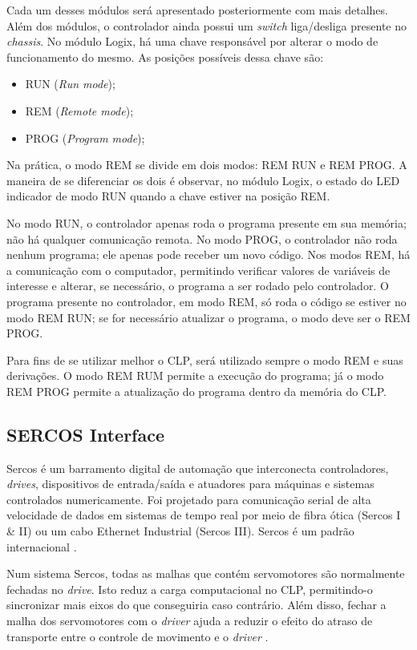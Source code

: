 Cada um desses módulos será apresentado posteriormente com mais detalhes. Além dos módulos, o controlador ainda possui um \textit{switch} liga/desliga presente no \textit{chassis}. No módulo Logix, há uma chave responsável por alterar o modo de funcionamento do mesmo. As posições possíveis dessa chave são:
\begin{itemize}
  \item RUN (\textit{Run mode});
  \item REM (\textit{Remote mode});
  \item PROG (\textit{Program mode});
\end{itemize}

Na prática, o modo REM se divide em dois modos: REM RUN e REM PROG. A maneira de se diferenciar os dois é observar, no módulo Logix, o estado do LED indicador de modo RUN quando a chave estiver na posição REM.

No modo RUN, o controlador apenas roda o programa presente em sua memória; não há qualquer comunicação remota. No modo PROG, o controlador não roda nenhum programa; ele apenas pode receber um novo código. Nos modos REM, há a comunicação com o computador, permitindo verificar valores de variáveis de interesse e alterar, se necessário, o programa a ser rodado pelo controlador. O programa presente no controlador, em modo REM, só roda o código se estiver no modo REM RUN; se for necessário atualizar o programa, o modo deve ser o REM PROG.

Para fins de se utilizar melhor o CLP, será utilizado sempre o modo REM e suas derivações. O modo REM RUM permite a execução do programa; já o modo REM PROG permite a atualização do programa dentro da memória do CLP.
\subsection{SERCOS Interface}

Sercos é um barramento digital de automação que interconecta controladores, \textit{drives}, dispositivos de entrada/saída e atuadores para máquinas e sistemas controlados numericamente. Foi projetado para comunicação serial de alta velocidade de dados em sistemas de tempo real por meio de fibra ótica (Sercos I \& II) ou um cabo Ethernet Industrial (Sercos III). Sercos é um padrão internacional \cite{sercos}.

Num sistema Sercos, todas as malhas que contém servomotores são normalmente fechadas no \textit{drive}. Isto reduz a carga computacional no CLP, permitindo-o sincronizar mais eixos do que conseguiria caso contrário. Além disso, fechar a malha dos servomotores com o \textit{driver} ajuda a reduzir o efeito do atraso de transporte entre o controle de movimento e o \textit{driver} \cite{sercos}.

